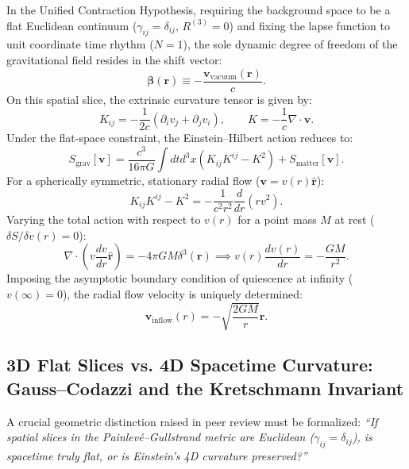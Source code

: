 \documentclass[11pt,a4paper]{article}
\begin{document}
In the Unified Contraction Hypothesis, requiring the background space to be a flat Euclidean continuum ($\gamma_{ij} = \delta_{ij}$, $R^{(3)} = 0$) and fixing the lapse function to unit coordinate time rhythm ($N = 1$), the sole dynamic degree of freedom of the gravitational field resides in the shift vector:
\begin{equation}
    \boldsymbol{\beta}(\mathbf{r}) \equiv -\frac{\mathbf{v}_{\mathrm{vacuum}}(\mathbf{r})}{c}.
    \label{eq:shift_vektor_p1}
\end{equation}
On this spatial slice, the extrinsic curvature tensor is given by:
\begin{equation}
    K_{ij} = -\frac{1}{2c} \left( \partial_i v_j + \partial_j v_i \right), \qquad K = -\frac{1}{c} \nabla \cdot \mathbf{v}.
\end{equation}
Under the flat-space constraint, the Einstein--Hilbert action reduces to:
\begin{equation}
    S_{\mathrm{grav}}[\mathbf{v}] = \frac{c^3}{16\pi G} \int dt d^3x \left( K_{ij} K^{ij} - K^2 \right) + S_{\mathrm{matter}}[\mathbf{v}].
\end{equation}
For a spherically symmetric, stationary radial flow ($\mathbf{v} = v(r) \hat{\mathbf{r}}$):
\begin{equation}
    K_{ij} K^{ij} - K^2 = -\frac{1}{c^2 r^2} \frac{d}{dr}\left( r v^2 \right).
\end{equation}
Varying the total action with respect to $v(r)$ for a point mass $M$ at rest ($\delta S / \delta v(r) = 0$):
\begin{equation}
    \nabla \cdot \left( v \frac{dv}{dr} \hat{\mathbf{r}} \right) = -4\pi G M \delta^3(\mathbf{r}) \implies v(r) \frac{dv(r)}{dr} = -\frac{GM}{r^2}.
\end{equation}
Imposing the asymptotic boundary condition of quiescence at infinity ($v(\infty) = 0$), the radial flow velocity is uniquely determined:
\begin{equation}
    \mathbf{v}_{\mathrm{inflow}}(r) = -\sqrt{\frac{2GM}{r}}\hat{\mathbf{r}}.
    \label{eq:nehir_hizi}
\end{equation}

\subsection{3D Flat Slices vs. 4D Spacetime Curvature: Gauss--Codazzi and the Kretschmann Invariant}
\label{sec:gauss_codazzi_egrilik_en}

A crucial geometric distinction raised in peer review must be formalized: \textit{``If spatial slices in the Painlevé--Gullstrand metric are Euclidean ($\gamma_{ij} = \delta_{ij}$), is spacetime truly flat, or is Einstein's 4D curvature preserved?''}
\end{document}
